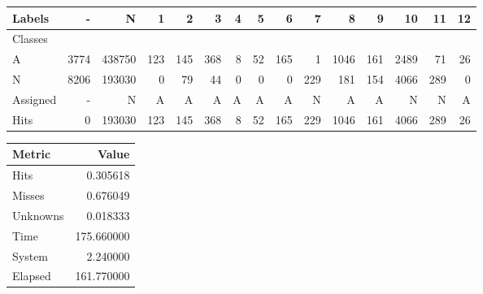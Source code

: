 \begin{tabular}{l||r|r|r|r|r|r|r|r|r|r|r|r|r|r}

Labels &     - &       N &    1 &    2 &    3 &  4 &   5 &    6 &    7 &     8 &    9 &    10 &   11 &  12 \\\hline
Classes  &       &         &      &      &      &    &     &      &      &       &      &       &      &     \\\hline
\hline
A        &  3774 &  438750 &  123 &  145 &  368 &  8 &  52 &  165 &    1 &  1046 &  161 &  2489 &   71 &  26 \\\hline
N        &  8206 &  193030 &    0 &   79 &   44 &  0 &   0 &    0 &  229 &   181 &  154 &  4066 &  289 &   0 \\\hline
\hline
Assigned &     - &       N &    A &    A &    A &  A &   A &    A &    N &     A &    A &     N &    N &   A \\\hline
Hits     &     0 &  193030 &  123 &  145 &  368 &  8 &  52 &  165 &  229 &  1046 &  161 &  4066 &  289 &  26 
\end{tabular}
\begin{tabular}{l|r}

Metric   &       Value \\\hline
\hline
Hits     &    0.305618 \\\hline
Misses   &    0.676049 \\\hline
Unknowns &    0.018333 \\\hline
Time     &  175.660000 \\\hline
System   &    2.240000 \\\hline
Elapsed  &  161.770000 
\end{tabular}
